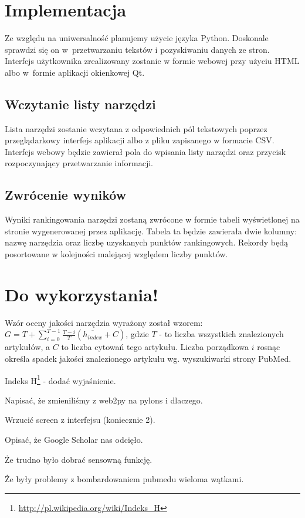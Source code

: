 \documentclass[11pt,a4paper]{article}
\begin{document}
\section{Implementacja}
Ze względu na uniwersalność planujemy użycie języka Python. Doskonale sprawdzi się on w~przetwarzaniu tekstów i pozyskiwaniu danych ze stron. Interfejs użytkownika zrealizowany zostanie w formie webowej przy użyciu {H}{T}{M}{L} albo w~formie aplikacji okienkowej Qt.

\subsection{Wczytanie listy narzędzi}
Lista narzędzi zostanie wczytana z odpowiednich pól tekstowych poprzez przeglądarkowy interfejs aplikacji albo z pliku zapisanego w formacie CSV. Interfejs webowy będzie zawierał pola do wpisania listy narzędzi oraz przycisk rozpoczynający przetwarzanie informacji.

\subsection{Zwrócenie wyników}
Wyniki rankingowania narzędzi zostaną zwrócone w formie tabeli wyświetlonej na stronie wygenerowanej przez aplikację. Tabela ta będzie zawierała dwie kolumny: nazwę narzędzia oraz liczbę uzyskanych punktów rankingowych. Rekordy będą posortowane w kolejności malejącej względem liczby punktów.

\section{Do wykorzystania!}
Wzór oceny jakości narzędzia wyrażony został wzorem: $G=T+\sum_{i=0}^{T-1}\frac{T-i}{T}(\overline{h_{index}}+C)$, gdzie $T$ - to liczba wszystkich znalezionych artykułów, a $C$ to liczba cytowań tego artykułu. Liczba porządkowa $i$ rosnąc określa spadek jakości znalezionego artykułu wg. wyszukiwarki strony PubMed.

Indeks H\footnote{\url{http://pl.wikipedia.org/wiki/Indeks_H}} - dodać wyjaśnienie.

Napisać, że zmieniliśmy z web2py na pylons i dlaczego.

Wrzucić screen z interfejsu (koniecznie 2).

Opisać, że Google Scholar nas odcięło.

Że trudno było dobrać sensowną funkcję.

Że były problemy z bombardowaniem pubmedu wieloma wątkami.
\end{document}
